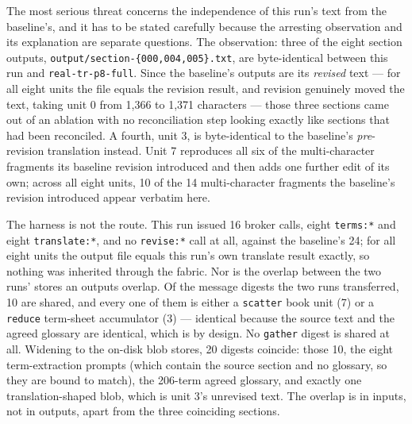 \documentclass[11pt]{article}
\begin{document}
The most serious threat concerns the independence of this run's text from the baseline's, and it has
to be stated carefully because the arresting observation and its explanation are separate questions.
The observation: three of the eight section outputs,
\texttt{output/section-\{000,004,005\}.txt}, are byte-identical between this run and
\texttt{real-tr-p8-full}. Since the baseline's outputs are its \emph{revised} text --- for all eight
units the file equals the revision result, and revision genuinely moved the text, taking unit 0 from
1,366 to 1,371 characters --- those three sections came out of an ablation with no reconciliation
step looking exactly like sections that had been reconciled. A fourth, unit 3, is byte-identical to
the baseline's \emph{pre}-revision translation instead. Unit 7 reproduces all six of the
multi-character fragments its baseline revision introduced and then adds one further edit of its own;
across all eight units, 10 of the 14 multi-character fragments the baseline's revision introduced
appear verbatim here.

The harness is not the route. This run issued 16 broker calls, eight \texttt{terms:*} and eight
\texttt{translate:*}, and no \texttt{revise:*} call at all, against the baseline's 24; for all eight
units the output file equals this run's own translate result exactly, so nothing was inherited
through the fabric. Nor is the overlap between the two runs' stores an outputs overlap. Of the
message digests the two runs transferred, 10 are shared, and every one of them is either a
\texttt{scatter} book unit (7) or a \texttt{reduce} term-sheet accumulator (3) --- identical because
the source text and the agreed glossary are identical, which is by design. No \texttt{gather} digest
is shared at all. Widening to the on-disk blob stores, 20 digests coincide: those 10, the eight
term-extraction prompts (which contain the source section and no glossary, so they are bound to
match), the 206-term agreed glossary, and exactly one translation-shaped blob, which is unit 3's
unrevised text. The overlap is in inputs, not in outputs, apart from the three coinciding sections.
\end{document}
